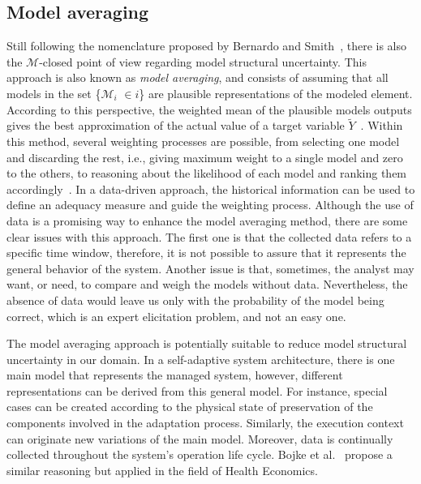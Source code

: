 \subsection{Model averaging}

Still following the nomenclature proposed by Bernardo and Smith~\cite{bernardo2009bayesian}, there is also the $\mathcal{M}$-closed point of view regarding model structural uncertainty. This approach is also known as \textit{model averaging}, and consists of assuming that all models in the set \{$\mathcal{M}_i$ $\in i$\} are plausible representations of the modeled element. According to this perspective, the weighted mean of the plausible models outputs gives the best approximation of the actual value of a target variable $\tilde{Y}$~\cite{strong2012managing}. Within this method, several weighting processes are possible, from selecting one model and discarding the rest, i.e., giving maximum weight to a single model and zero to the others, to reasoning about the likelihood of each model and ranking them accordingly~\cite{kadane2004methods, jackson2009accounting}. In a data-driven approach, the historical information can be used to define an adequacy measure and guide the weighting process. Although the use of data is a promising way to enhance the model averaging method, there are some clear issues with this approach. The first one is that the collected data refers to a specific time window, therefore, it is not possible to assure that it represents the general behavior of the system. Another issue is that, sometimes, the analyst may want, or need, to compare and weigh the models without data. Nevertheless, the absence of data would leave us only with the probability of the model being correct, which is an expert elicitation problem, and not an easy one.

The model averaging approach is potentially suitable to reduce model structural uncertainty in our domain. In a self-adaptive system architecture, there is one main model that represents the managed system, however, different representations can be derived from this general model. For instance, special cases can be created according to the physical state of preservation of the components involved in the adaptation process. Similarly, the execution context can originate new variations of the main model. Moreover, data is continually collected throughout the system’s operation life cycle. Bojke et al.~\cite{bojke2009characterizing} propose a similar reasoning but applied in the field of Health Economics.


